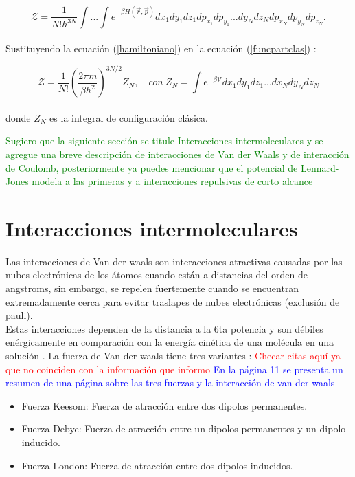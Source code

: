 \begin{equation} \label{funcpartclas}
    \mathcal{Z} = \frac{1}{N!h^{3N}}\int ...\int e^{-\beta H(\vec{r},\vec{p})}dx_1dy_1dz_1dp_{x_1}dp_{y_1}...dy_N dz_Ndp_{x_N}dp_{y_N}dp_{z_N}.
\end{equation}\\

Sustituyendo la ecuación (\ref{hamiltoniano}) en la ecuación (\ref{funcpartclas}) \cite{feynman1972statistical}:

\begin{equation} \label{funcpartclasconfig}
    \mathcal{Z} = \frac{1}{N!}\left( \frac{2\pi m}{\beta h^2} \right)^{3N/2}Z_N,\quad con\ Z_N = \int e^{-\beta \mathcal{V}}dx_1dy_1dz_1...dx_N dy_N dz_N
\end{equation}\\

donde $Z_N$ es la integral de configuración clásica.

\textcolor{green}{Sugiero que la siguiente sección se titule 
Interacciones intermoleculares y se agregue una breve descripción de interacciones de Van der Waals y de interacción de Coulomb, posteriormente ya puedes mencionar que el potencial de Lennard-Jones modela a las primeras y a interacciones repulsivas de corto alcance}


\section{Interacciones intermoleculares}

Las interacciones de Van der waals son interacciones atractivas causadas por las nubes electrónicas de los átomos cuando están a distancias del orden de angstroms, sin embargo, se repelen fuertemente cuando se encuentran extremadamente cerca para evitar traslapes de nubes electrónicas (exclusión de pauli).\\

Estas interacciones dependen de la distancia a la 6ta potencia y son débiles enérgicamente en comparación con la energía cinética de una molécula en una solución \cite{201753}. La fuerza de Van der waals tiene tres variantes \cite{ROY20151}: \textcolor{red}{Checar citas aquí ya que no coinciden con la información que informo} \textcolor{blue}{En la página 11 se presenta un resumen de una página sobre las tres fuerzas y la interacción de van der waals}

\begin{itemize}
    \item Fuerza Keesom: Fuerza de atracción entre dos dipolos permanentes.
    \item Fuerza Debye: Fuerza de atracción entre un dipolos permanentes y un dipolo inducido.
    \item Fuerza London: Fuerza de atracción entre dos dipolos inducidos.
\end{itemize}

